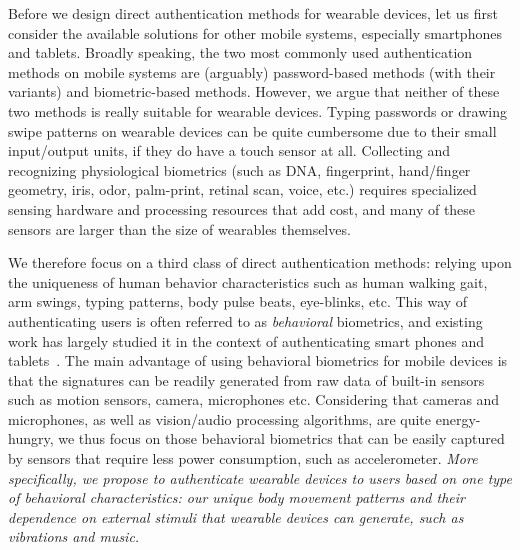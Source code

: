 
Before we design direct authentication methods for wearable devices, let us first consider the available solutions for other mobile systems, especially smartphones and tablets. Broadly speaking, the two most commonly used authentication methods on mobile systems are (arguably) password-based methods (with their variants) and biometric-based methods. However, we argue that neither of these two methods is really suitable for wearable devices. Typing passwords or drawing swipe patterns on wearable devices can be quite cumbersome due to their small input/output units, if they do have a touch sensor at all. Collecting and recognizing physiological biometrics (such as DNA, fingerprint, hand/finger geometry, iris, odor, palm-print, retinal scan, voice, etc.) requires specialized sensing hardware and processing resources that add cost, and many of these sensors are larger than the size of wearables themselves.

We therefore focus on a third class of direct authentication methods: relying upon the uniqueness of human behavior characteristics such as human walking gait, arm swings, typing patterns, body pulse beats, eye-blinks, etc. This way of authenticating users is often referred to as \emph{behavioral} biometrics, and existing work has largely studied it in the context of authenticating smart phones and tablets~\cite{rahman2014bodybeat,cornelius2014wearable,stevenage1999visual,okumura2006study,monrose2000keystroke,jorgensen2011mouse,bo2013silentsense,de2012touch}. The main advantage of using behavioral biometrics for mobile devices is that the signatures can be readily generated from raw data of built-in sensors such as motion sensors, camera, microphones etc. Considering that cameras and microphones, as well as vision/audio processing algorithms, are quite energy-hungry, we thus focus on those behavioral biometrics that can be easily captured by sensors that require less power consumption, such as accelerometer. \emph{More specifically, we propose to authenticate wearable devices to users based on one type of behavioral characteristics: our unique body movement patterns and their dependence on external stimuli that wearable devices can generate, such as vibrations and music.}


